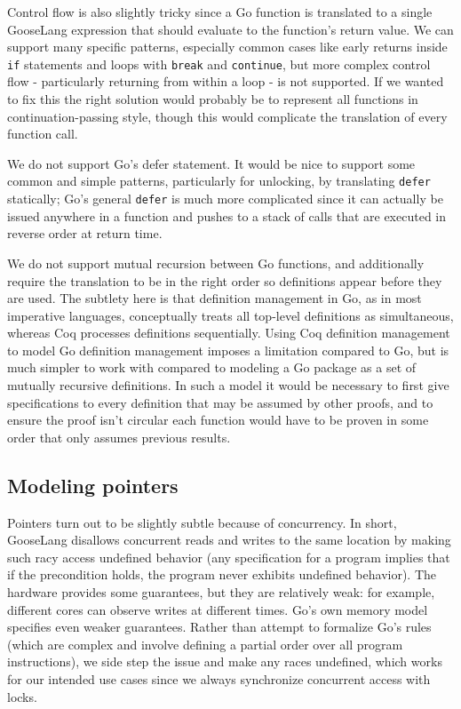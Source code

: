 Control flow is also slightly tricky since a Go function is translated
to a single GooseLang expression that should evaluate to the function's
return value. We can support many specific patterns, especially common
cases like early returns inside \texttt{if} statements and loops with
\texttt{break} and \texttt{continue}, but more complex control flow -
particularly returning from within a loop - is not supported. If we
wanted to fix this the right solution would probably be to represent all
functions in continuation-passing style, though this would complicate
the translation of every function call.

We do not support Go's defer statement. It would be nice to support some
common and simple patterns, particularly for unlocking, by translating
\texttt{defer} statically; Go's general \texttt{defer} is much more
complicated since it can actually be issued anywhere in a function and
pushes to a stack of calls that are executed in reverse order at return
time.

We do not support mutual recursion between Go functions, and
additionally require the translation to be in the right order so
definitions appear before they are used. The subtlety here is that
definition management in Go, as in most imperative languages,
conceptually treats all top-level definitions as simultaneous, whereas
Coq processes definitions sequentially. Using Coq definition management
to model Go definition management imposes a limitation compared to Go,
but is much simpler to work with compared to modeling a Go package as a
set of mutually recursive definitions. In such a model it would be
necessary to first give specifications to every definition that may be
assumed by other proofs, and to ensure the proof isn't circular each
function would have to be proven in some order that only assumes
previous results.

\hypertarget{modeling-pointers}{%
\subsection{Modeling pointers}\label{modeling-pointers}}

Pointers turn out to be slightly subtle because of concurrency. In
short, GooseLang disallows concurrent reads and writes to the same
location by making such racy access undefined behavior (any
specification for a program implies that if the precondition holds, the
program never exhibits undefined behavior). The hardware provides some
guarantees, but they are relatively weak: for example, different cores
can observe writes at different times. Go's own memory model specifies
even weaker guarantees. Rather than attempt to formalize Go's rules
(which are complex and involve defining a partial order over all program
instructions), we side step the issue and make any races undefined,
which works for our intended use cases since we always synchronize
concurrent access with locks.

